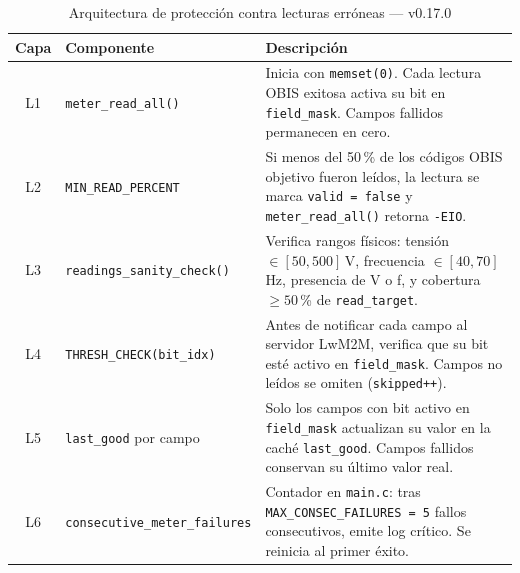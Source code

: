 
\begin{table}[htbp]
\centering
\caption{Arquitectura de protección contra lecturas erróneas — v0.17.0}
\label{tab:protection-layers-v017}
\begin{tabular}{c l p{7.5cm}}
\toprule
\textbf{Capa} & \textbf{Componente} & \textbf{Descripción} \\
\midrule
L1 & \texttt{meter\_read\_all()}
   & Inicia con \texttt{memset(0)}. Cada lectura OBIS exitosa
     activa su bit en \texttt{field\_mask}. Campos fallidos
     permanecen en cero. \\
\addlinespace
L2 & \texttt{MIN\_READ\_PERCENT}
   & Si menos del 50\,\% de los códigos OBIS objetivo fueron
     leídos, la lectura se marca \texttt{valid = false} y
     \texttt{meter\_read\_all()} retorna \texttt{-EIO}. \\
\addlinespace
L3 & \texttt{readings\_sanity\_check()}
   & Verifica rangos físicos: tensión $\in [50, 500]$\,V,
     frecuencia $\in [40, 70]$\,Hz, presencia de V o f,
     y cobertura $\geq 50$\,\% de \texttt{read\_target}. \\
\addlinespace
L4 & \texttt{THRESH\_CHECK(bit\_idx)}
   & Antes de notificar cada campo al servidor LwM2M,
     verifica que su bit esté activo en \texttt{field\_mask}.
     Campos no leídos se omiten (\texttt{skipped++}). \\
\addlinespace
L5 & \texttt{last\_good} por campo
   & Solo los campos con bit activo en \texttt{field\_mask}
     actualizan su valor en la caché \texttt{last\_good}.
     Campos fallidos conservan su último valor real. \\
\addlinespace
L6 & \texttt{consecutive\_meter\_failures}
   & Contador en \texttt{main.c}: tras
     \texttt{MAX\_CONSEC\_FAILURES = 5} fallos consecutivos,
     emite log crítico. Se reinicia al primer éxito. \\
\bottomrule
\end{tabular}
\end{table}
